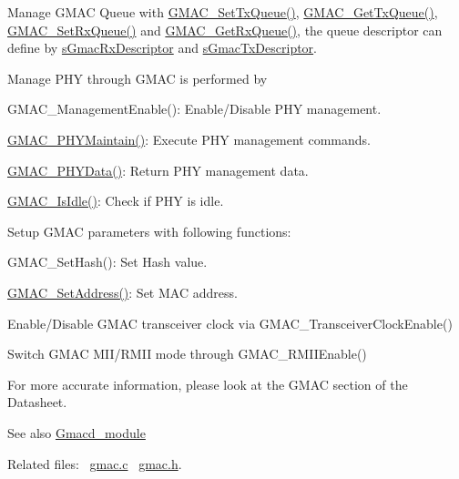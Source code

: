 \begin{DoxyItemize}
\item Manage G\+M\+AC Queue with \mbox{\hyperlink{group__gmac__defines_ga599028cc27124c0c292562833f31319c}{G\+M\+A\+C\+\_\+\+Set\+Tx\+Queue()}}, \mbox{\hyperlink{group__gmac__defines_ga639d2d7bdfcd93c39d183b84a5b02a34}{G\+M\+A\+C\+\_\+\+Get\+Tx\+Queue()}}, \mbox{\hyperlink{group__gmac__defines_gab6728c6253143037bbc9c30befe81c19}{G\+M\+A\+C\+\_\+\+Set\+Rx\+Queue()}} and \mbox{\hyperlink{group__gmac__defines_ga75a37904d053aee0b413914d73b45ff1}{G\+M\+A\+C\+\_\+\+Get\+Rx\+Queue()}}, the queue descriptor can define by \mbox{\hyperlink{group__gmac__structs_ga60c9fd1b0bff688c6e72c825d088a50b}{s\+Gmac\+Rx\+Descriptor}} and \mbox{\hyperlink{group__gmac__structs_ga69a2b24578edebf2e816c4d3ca20edeb}{s\+Gmac\+Tx\+Descriptor}}.
\item Manage P\+HY through G\+M\+AC is performed by
\begin{DoxyItemize}
\item G\+M\+A\+C\+\_\+\+Management\+Enable()\+: Enable/\+Disable P\+HY management.
\item \mbox{\hyperlink{group__gmac__defines_ga6f6f590403bb6a1e27b19715fae19d20}{G\+M\+A\+C\+\_\+\+P\+H\+Y\+Maintain()}}\+: Execute P\+HY management commands.
\item \mbox{\hyperlink{group__gmac__defines_gac8f081caf9548311d6bd54ce1fca606d}{G\+M\+A\+C\+\_\+\+P\+H\+Y\+Data()}}\+: Return P\+HY management data.
\item \mbox{\hyperlink{group__gmac__defines_gaa08d910a6f3f99c429158ad429368ffc}{G\+M\+A\+C\+\_\+\+Is\+Idle()}}\+: Check if P\+HY is idle.
\end{DoxyItemize}
\item Setup G\+M\+AC parameters with following functions\+:
\begin{DoxyItemize}
\item G\+M\+A\+C\+\_\+\+Set\+Hash()\+: Set Hash value.
\item \mbox{\hyperlink{group__gmac__defines_ga52528649e180e7e7ed1b9533ec6337fd}{G\+M\+A\+C\+\_\+\+Set\+Address()}}\+: Set M\+AC address.
\end{DoxyItemize}
\item Enable/\+Disable G\+M\+AC transceiver clock via G\+M\+A\+C\+\_\+\+Transceiver\+Clock\+Enable()
\item Switch G\+M\+AC M\+I\+I/\+R\+M\+II mode through G\+M\+A\+C\+\_\+\+R\+M\+I\+I\+Enable()
\end{DoxyItemize}

For more accurate information, please look at the G\+M\+AC section of the Datasheet.

\begin{DoxySeeAlso}{See also}
\mbox{\hyperlink{group__gmacd__module}{Gmacd\+\_\+module}}
\end{DoxySeeAlso}
Related files\+:~\newline
\mbox{\hyperlink{gmac_8c}{gmac.\+c}}~\newline
\mbox{\hyperlink{gmac_8h}{gmac.\+h}}.~\newline
